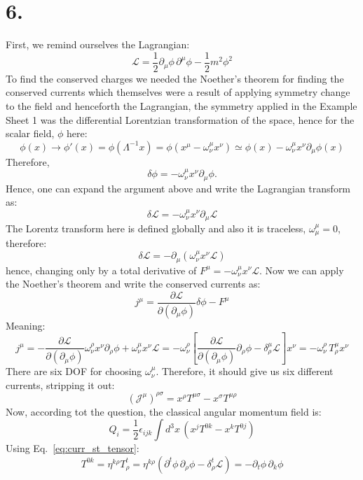 \documentclass{article}
\newcommand{\pdm}{\partial_\mu}  %
\newcommand{\pdup}{\partial^\mu}  %
\newcommand{\onehalf}{\frac{1}{2}}
\newcommand{\lagden}{\mathcal{L}}
\begin{document}
\section*{6.}
First, we remind ourselves the Lagrangian:
\begin{equation}
    \lagden = \onehalf\pdm\phi \,\pdup\phi - \onehalf m^2\phi^2
\end{equation}
To find the conserved charges we needed the Noether's theorem for finding the conserved currents which themselves were a result of applying symmetry change to the field and henceforth the Lagrangian, the symmetry applied in the Example Sheet 1 was the differential Lorentzian transformation of the space, hence for the scalar field, $\phi$ here:
\begin{equation}
    \phi(x)\to \phi'(x) =  \phi(\Lambda^{-1}x) = \phi(x^\mu -\omega^\mu_\nu x^\nu) \simeq \phi(x) - \omega^\mu_\nu x^\nu\pdm\phi(x)  
\end{equation}
Therefore,
\begin{equation}
    \delta\phi =-\omega^\mu_\nu x^\nu\pdm\phi .
\end{equation}
Hence, one can expand the argument above and write the Lagrangian transform as:
\begin{equation}
    \delta\lagden = -\omega^\mu_\nu x^\nu\pdm\lagden
\end{equation}
The Lorentz transform here is defined globally and also it is traceless, $\omega^\mu_\mu = 0$, therefore:
\begin{equation}
    \delta\lagden = -\pdm (\omega^\mu_\nu x^\nu \lagden)
\end{equation}
hence, changing only by a total derivative of $F^\mu = -\omega^\mu_\nu x^\nu \lagden$. Now we can apply the Noether's theorem and write the conserved currents as:
\begin{equation}
    j^\mu = \frac{\partial\lagden}{\partial(\pdm\phi)}\delta\phi - F^\mu
\end{equation}
Meaning:
\begin{equation}\label{eq:curr_st_tensor}
    j^\mu = -\frac{\partial\lagden}{\partial(\pdm\phi)}\omega^\rho_\nu x^\nu \partial_\rho \phi +  \omega^\mu_\nu x^\nu \lagden=-\omega^\rho_\nu [\frac{\partial\lagden}{\partial(\pdm\phi)}\partial_\rho\phi - \delta^\mu_\rho\lagden]x^\nu = -\omega^\rho_\nu\, T^\mu_\rho x^\nu
\end{equation}
There are six DOF for choosing $\omega^\mu_\nu$. Therefore, it should give us six different currents, stripping it out:
\begin{equation}
    (\mathcal{J}^\mu)^{\rho\sigma} = x^\rho T^{\mu\sigma} - x^\sigma T^{\mu \rho}
\end{equation}
Now, according tot the question, the classical angular momentum field is:
\begin{equation}
    Q_i = \frac12 \epsilon_{ijk}\int d^3x\, (x^j T^{0k} - x^k T^{0j})
\end{equation}
Using Eq.~\eqref{eq:curr_st_tensor}:
\begin{equation}
    T^{0k} = \eta^{k\rho} T^t_\rho = \eta^{k\rho}(\partial^t\phi\,\partial_\rho\phi - \delta^t_\rho\lagden) = -\partial_t\phi \,\partial_k \phi
\end{equation}
\end{document}
